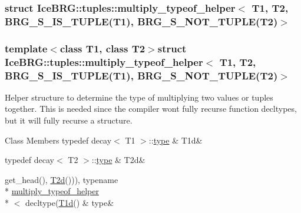 \subsubsection{struct Ice\+B\+R\+G\+:\+:tuples\+:\+:multiply\+\_\+typeof\+\_\+helper$<$ T1, T2, B\+R\+G\+\_\+\+S\+\_\+\+I\+S\+\_\+\+T\+U\+P\+L\+E(T1), B\+R\+G\+\_\+\+S\+\_\+\+N\+O\+T\+\_\+\+T\+U\+P\+L\+E(T2)$>$}
\subsubsection*{template$<$class T1, class T2$>$struct Ice\+B\+R\+G\+::tuples\+::multiply\+\_\+typeof\+\_\+helper$<$ T1, T2, B\+R\+G\+\_\+\+S\+\_\+\+I\+S\+\_\+\+T\+U\+P\+L\+E(\+T1), B\+R\+G\+\_\+\+S\+\_\+\+N\+O\+T\+\_\+\+T\+U\+P\+L\+E(\+T2)$>$}

Helper structure to determine the type of multiplying two values or tuples together. This is needed since the compiler won\textquotesingle{}t fully recurse function decltypes, but it will fully recurse a structure. \begin{DoxyFields}{Class Members}
\hypertarget{namespaceIceBRG_1_1tuples_aa2583e993d44e330d94823cd43602ad5}{}typedef decay$<$ T1 $>$\+::\hyperlink{namespaceIceBRG_1_1tuples_abea59dce5657fb6ea23a6f398a16b9ff}{type}\label{namespaceIceBRG_1_1tuples_aa2583e993d44e330d94823cd43602ad5}
&
T1d&
\\
\hline

\hypertarget{namespaceIceBRG_1_1tuples_a3a7c562e835b743e2e6b95a2449f30c1}{}typedef decay$<$ T2 $>$\+::\hyperlink{namespaceIceBRG_1_1tuples_abea59dce5657fb6ea23a6f398a16b9ff}{type}\label{namespaceIceBRG_1_1tuples_a3a7c562e835b743e2e6b95a2449f30c1}
&
T2d&
\\
\hline

\hypertarget{namespaceIceBRG_1_1tuples_abea59dce5657fb6ea23a6f398a16b9ff}{}get\+\_\+head(), \hyperlink{namespaceIceBRG_1_1tuples_a3a7c562e835b743e2e6b95a2449f30c1}{T2d}())), typename \\*
\hyperlink{namespaceIceBRG_1_1tuples_structIceBRG_1_1tuples_1_1multiply__typeof__helper}{multiply\+\_\+typeof\+\_\+helper}\\*
$<$ decltype(\hyperlink{namespaceIceBRG_1_1tuples_aa2583e993d44e330d94823cd43602ad5}{T1d}()\label{namespaceIceBRG_1_1tuples_abea59dce5657fb6ea23a6f398a16b9ff}
&
type&
\\
\hline

\end{DoxyFields}
\label{structIceBRG_1_1tuples_1_1multiply__typeof__helper_3_01T1_00_01T2_00_01BRG__S__NOT__TUPLE_07T1_0f8b2bfe2074bcff168e50ce88774b3d8}
\hypertarget{namespaceIceBRG_1_1tuples_structIceBRG_1_1tuples_1_1multiply__typeof__helper_3_01T1_00_01T2_00_01BRG__S__NOT__TUPLE_07T1_0f8b2bfe2074bcff168e50ce88774b3d8}{}
